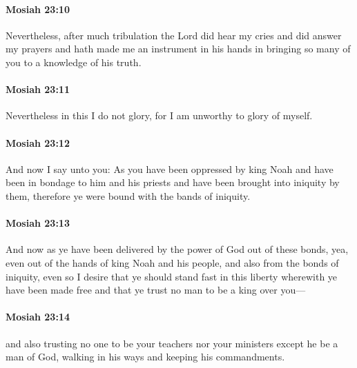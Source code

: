 		\paragraph{Mosiah 23:10} %
			\label{MOSIAH-23-10}

			Nevertheless, after much tribulation the Lord did hear my cries
			and did answer my prayers
			and hath made me an instrument in his hands
			in bringing so many of you to a knowledge of his truth.

		\paragraph{Mosiah 23:11} %
			\label{MOSIAH-23-11}

			Nevertheless in this I do not glory,
			for I am unworthy to glory of myself.

		\paragraph{Mosiah 23:12} %
			\label{MOSIAH-23-12}

			And now I say unto you:
			As you have been oppressed by king Noah
			and have been in bondage to him and his priests
			and have been brought into iniquity by them,
			therefore ye were bound with the bands of iniquity.

		\paragraph{Mosiah 23:13} %
			\label{MOSIAH-23-13}

			And now as ye have been delivered by the power of God out of these bonds,
			yea, even out of the hands of king Noah and his people,
			and also from the bonds of iniquity,
			even so I desire that ye should stand fast in this liberty
			wherewith ye have been made free
			and that ye trust no man to be a king over you---

		\paragraph{Mosiah 23:14} %
			\label{MOSIAH-23-14}

			and also trusting no one to be your teachers nor your ministers
			except he be a man of God,
			walking in his ways and keeping his commandments.

